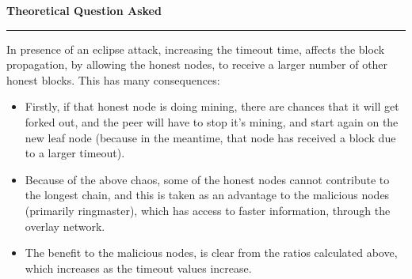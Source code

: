 \documentclass[a4paper,12pt]{article}
\newenvironment{solution}[2][]{%
\begin{mdframed}[linecolor=blue!70!black, linewidth=2pt, roundcorner=10pt, backgroundcolor=yellow!10!white, skipabove=12pt, skipbelow=12pt]%
	\textbf{\large #2}
	\par\noindent\rule{\textwidth}{0.4pt}
}{
\end{mdframed}
}
\begin{document}
\begin{solution}{Theoretical Question Asked}
	In presence of an eclipse attack, increasing the timeout time, affects the block propagation, by allowing the honest nodes, to receive a larger number of other honest blocks. This has many consequences:
	\begin{itemize}
		\item Firstly, if that honest node is doing mining, there are chances that it will get forked out, and the peer will have to stop it's mining, and start again on the new leaf node (because in the meantime, that node has received a block due to a larger timeout).
		\item Because of the above chaos, some of the honest nodes cannot contribute to the longest chain, and this is taken as an advantage to the malicious nodes (primarily ringmaster), which has access to faster information, through the overlay network.
		\item The benefit to the malicious nodes, is clear from the ratios calculated above, which increases as the timeout values increase.
	\end{itemize}


\end{solution}
\end{document}
